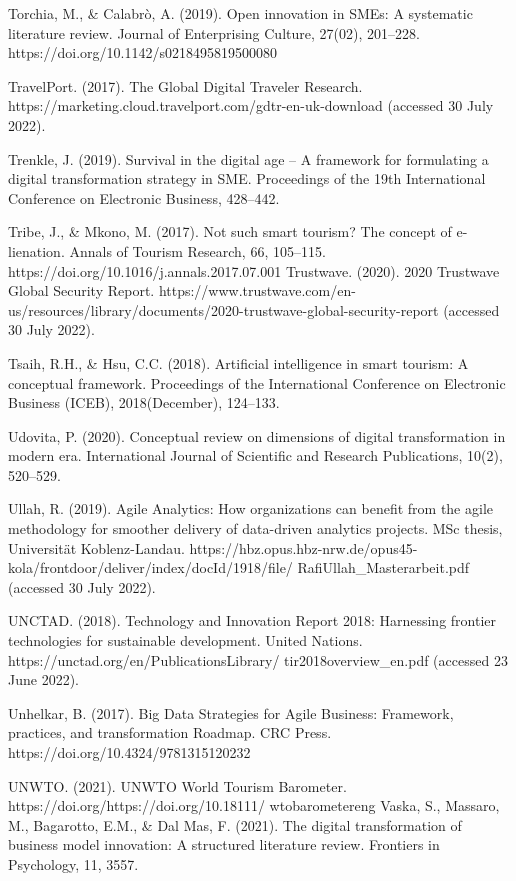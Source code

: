 \documentclass[
  letterpaper,
  DIV=11,
  numbers=noendperiod]{scrreprt}
\begin{document}
Torchia, M., \& Calabrò, A. (2019). Open innovation in SMEs: A
systematic literature review. Journal of Enterprising Culture, 27(02),
201--228. https://doi.org/10.1142/s0218495819500080

TravelPort. (2017). The Global Digital Traveler Research.
https://marketing.cloud.travelport.com/gdtr-en-uk-download (accessed 30
July 2022).

Trenkle, J. (2019). Survival in the digital age -- A framework for
formulating a digital transformation strategy in SME. Proceedings of the
19th International Conference on Electronic Business, 428--442.

Tribe, J., \& Mkono, M. (2017). Not such smart tourism? The concept of
e-lienation. Annals of Tourism Research, 66, 105--115.
https://doi.org/10.1016/j.annals.2017.07.001 Trustwave. (2020). 2020
Trustwave Global Security Report.
https://www.trustwave.com/en-us/resources/library/documents/2020-trustwave-global-security-report
(accessed 30 July 2022).

Tsaih, R.H., \& Hsu, C.C. (2018). Artificial intelligence in smart
tourism: A conceptual framework. Proceedings of the International
Conference on Electronic Business (ICEB), 2018(December), 124--133.

Udovita, P. (2020). Conceptual review on dimensions of digital
transformation in modern era. International Journal of Scientific and
Research Publications, 10(2), 520--529.

Ullah, R. (2019). Agile Analytics: How organizations can benefit from
the agile methodology for smoother delivery of data-driven analytics
projects. MSc thesis, Universität Koblenz-Landau.
https://hbz.opus.hbz-nrw.de/opus45-kola/frontdoor/deliver/index/docId/1918/file/
RafiUllah\_Masterarbeit.pdf (accessed 30 July 2022).

UNCTAD. (2018). Technology and Innovation Report 2018: Harnessing
frontier technologies for sustainable development. United Nations.
https://unctad.org/en/PublicationsLibrary/ tir2018overview\_en.pdf
(accessed 23 June 2022).

Unhelkar, B. (2017). Big Data Strategies for Agile Business: Framework,
practices, and transformation Roadmap. CRC Press.
https://doi.org/10.4324/9781315120232

UNWTO. (2021). UNWTO World Tourism Barometer.
https://doi.org/https://doi.org/10.18111/ wtobarometereng Vaska, S.,
Massaro, M., Bagarotto, E.M., \& Dal Mas, F. (2021). The digital
transformation of business model innovation: A structured literature
review. Frontiers in Psychology, 11, 3557.
\end{document}
